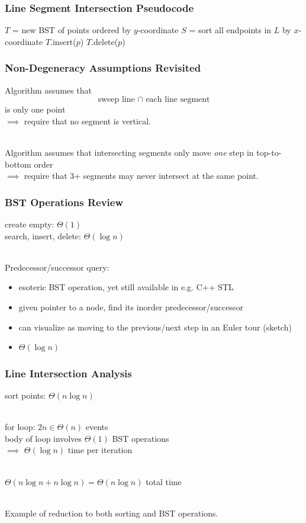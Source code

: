 \documentclass{beamer}
\newcommand{\stanza}{ \\~\ }
\begin{document}
\begin{frame} \frametitle{Line Segment Intersection Pseudocode}
  {\footnotesize
  \begin{algorithmic}[1]
      \State $T$ = new BST of points ordered by $y$-coordinate
      \State $S$ = sort all endpoints in $L$ by $x$-coordinate
          \State $T$.insert($p$)
            \State {}
          \EndIf
        \Else {}
            \State {}
          \EndIf
          \State $T$.delete($p$)
        \EndIf
      \EndFor
      \State {}
    \EndFunction
  \end{algorithmic}
  }
\end{frame}

\begin{frame} \frametitle{Non-Degeneracy Assumptions Revisited}
Algorithm assumes that
\[ \text{sweep line } \cap \text{ each line segment} \]
is only one point \\
$\implies$ require that no segment is vertical. \stanza

Algorithm assumes that intersecting segments only move \emph{one} step
in top-to-bottom order \\
$\implies$ require that 3+ segments may never intersect at the same point.
\end{frame}

\begin{frame} \frametitle{BST Operations Review}
create empty: $\Theta(1)$ \\
search, insert, delete: $\Theta(\log n)$ \stanza

Predecessor/successor query:
\begin{itemize}
  \item esoteric BST operation, yet still available in e.g. C++ STL
  \item given pointer to a node, find its inorder predecessor/successor
  \item can visualize as moving to the previous/next step in an Euler tour
    (sketch)
  \item $\Theta(\log n)$
\end{itemize}
\end{frame}

\begin{frame} \frametitle{Line Intersection Analysis}
  sort points: $\Theta(n \log n)$ \stanza

  for loop: $2n \in \Theta(n)$ events \\
  body of loop involves $\Theta(1)$ BST operations \\
  $\implies$ $\Theta(\log n)$ time per iteration \stanza

  $\Theta(n \log n + n \log n) = \Theta(n \log n)$ total time \stanza

  Example of reduction to both sorting and BST operations.
\end{frame}
\end{document}
